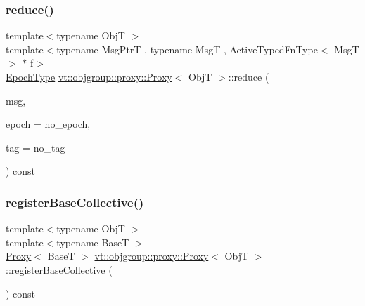 \mbox{\label{structvt_1_1objgroup_1_1proxy_1_1_proxy_a9c3426ebd305b7b0643bd91fbb79cbe7}} 
\subsubsection{\texorpdfstring{reduce()}{reduce()}\hspace{0.1cm}{\footnotesize\ttfamily [3/3]}}
{\footnotesize\ttfamily template$<$typename ObjT $>$ \\
template$<$typename Msg\+PtrT , typename MsgT , Active\+Typed\+Fn\+Type$<$ Msg\+T $>$ $\ast$ f$>$ \\
\hyperlink{namespacevt_a985a5adf291c34a3ca263b3378388236}{Epoch\+Type} \hyperlink{structvt_1_1objgroup_1_1proxy_1_1_proxy}{vt\+::objgroup\+::proxy\+::\+Proxy}$<$ ObjT $>$\+::reduce (\begin{DoxyParamCaption}\item[{Msg\+PtrT}]{msg,  }\item[{\hyperlink{namespacevt_a985a5adf291c34a3ca263b3378388236}{Epoch\+Type}}]{epoch = {\ttfamily no\+\_\+epoch},  }\item[{\hyperlink{namespacevt_a84ab281dae04a52a4b243d6bf62d0e52}{Tag\+Type}}]{tag = {\ttfamily no\+\_\+tag} }\end{DoxyParamCaption}) const}

\mbox{\label{structvt_1_1objgroup_1_1proxy_1_1_proxy_a3504fe25af8c839995a98d445af37282}} 
\subsubsection{\texorpdfstring{register\+Base\+Collective()}{registerBaseCollective()}}
{\footnotesize\ttfamily template$<$typename ObjT $>$ \\
template$<$typename BaseT $>$ \\
\hyperlink{structvt_1_1objgroup_1_1proxy_1_1_proxy}{Proxy}$<$ BaseT $>$ \hyperlink{structvt_1_1objgroup_1_1proxy_1_1_proxy}{vt\+::objgroup\+::proxy\+::\+Proxy}$<$ ObjT $>$\+::register\+Base\+Collective (\begin{DoxyParamCaption}{ }\end{DoxyParamCaption}) const}

